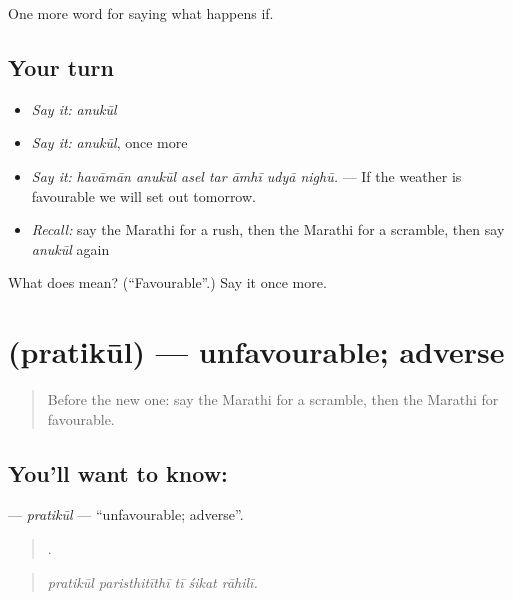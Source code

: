 \begin{grammarlens}[title={What you've built}]
One more word for saying what happens if.
\end{grammarlens}

\subsection*{Your turn}
\begin{itemize}
\raggedright
  \item \emph{Say it:} \emph{anukūl}
  \item \emph{Say it:} \emph{anukūl}, once more
  \item \emph{Say it:} \emph{havāmān anukūl asel tar āmhī udyā nighū.} — If the weather is favourable we will set out tomorrow.
  \item \emph{Recall:} say the Marathi for a rush, then the Marathi for a scramble, then say \emph{anukūl} again
\end{itemize}

\begin{tcolorbox}[breakable,colback=teal!4,colframe=teal!35!black,title={Before you move on}]
What does  mean? (\textquotedblleft{}Favourable\textquotedblright{}.) Say it once more.
\end{tcolorbox}
\section[\texorpdfstring{\mr{प्रतिकूल} (pratikūl)}{प्रतिकूल (pratikūl)}]{ (pratikūl) — unfavourable; adverse}

\label{lesson:MR-C556-pratikul}



\begin{quote}
Before the new one: say the Marathi for a scramble, then the Marathi for favourable.
\end{quote}

\subsection*{You'll want to know: }
\textbf{} — \emph{pratikūl} — \textquotedblleft{}unfavourable; adverse\textquotedblright{}.

\begin{quote}
    .
\end{quote}

\begin{quote}
\emph{pratikūl paristhitīthī tī śikat rāhilī.}
\end{quote}

